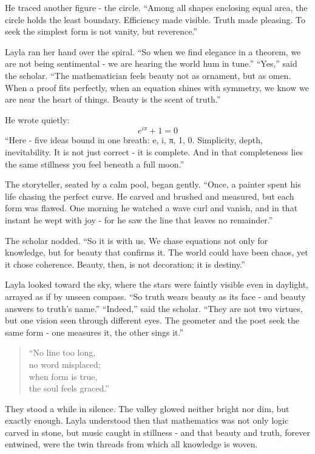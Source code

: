\documentclass[
  letterpaper,
  DIV=11,
  numbers=noendperiod]{scrreprt}
\begin{document}
He traced another figure - the circle. ``Among all shapes enclosing
equal area, the circle holds the least boundary. Efficiency made
visible. Truth made pleasing. To seek the simplest form is not vanity,
but reverence.''

Layla ran her hand over the spiral. ``So when we find elegance in a
theorem, we are not being sentimental - we are hearing the world hum in
tune.'' ``Yes,'' said the scholar. ``The mathematician feels beauty not
as ornament, but as omen. When a proof fits perfectly, when an equation
shines with symmetry, we know we are near the heart of things. Beauty is
the scent of truth.''

He wrote quietly: \[
e^{i\pi} + 1 = 0
\] ``Here - five ideas bound in one breath: e, i, π, 1, 0. Simplicity,
depth, inevitability. It is not just correct - it is complete. And in
that completeness lies the same stillness you feel beneath a full
moon.''

The storyteller, seated by a calm pool, began gently. ``Once, a painter
spent his life chasing the perfect curve. He carved and brushed and
measured, but each form was flawed. One morning he watched a wave curl
and vanish, and in that instant he wept with joy - for he saw the line
that leaves no remainder.''

The scholar nodded. ``So it is with us. We chase equations not only for
knowledge, but for beauty that confirms it. The world could have been
chaos, yet it chose coherence. Beauty, then, is not decoration; it is
destiny.''

Layla looked toward the sky, where the stars were faintly visible even
in daylight, arrayed as if by unseen compass. ``So truth wears beauty as
its face - and beauty answers to truth's name.'' ``Indeed,'' said the
scholar. ``They are not two virtues, but one vision seen through
different eyes. The geometer and the poet seek the same form - one
measures it, the other sings it.''

\begin{quote}
``No line too long,\\
no word misplaced;\\
when form is true,\\
the soul feels graced.''
\end{quote}

They stood a while in silence. The valley glowed neither bright nor dim,
but exactly enough. Layla understood then that mathematics was not only
logic carved in stone, but music caught in stillness - and that beauty
and truth, forever entwined, were the twin threads from which all
knowledge is woven.
\end{document}
